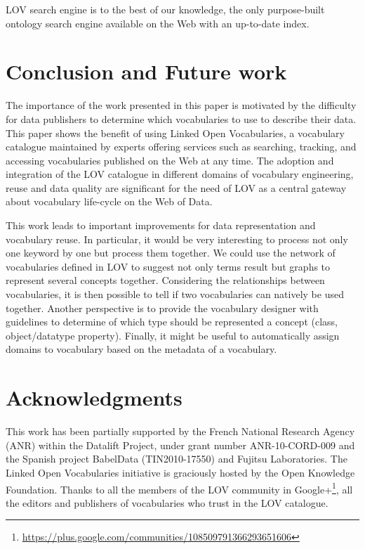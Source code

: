\documentclass{iosart2c}
\newcommand{\TODO}[1]{\textcolor{red}{\textbf{[TODO:#1]}}}
\begin{document}
LOV search engine is to the best of our knowledge, the only purpose-built ontology search engine available on the Web with an up-to-date index.

\section{Conclusion and Future work}
\label{sec:conclusion}
The importance of the work presented in this paper is motivated by the difficulty for data publishers to determine which vocabularies to use to describe their data. This paper shows the benefit of using Linked Open Vocabularies, a vocabulary catalogue maintained by experts offering services such as searching, tracking, and accessing vocabularies published on the Web at any time. The adoption and integration of the LOV catalogue in different domains of vocabulary engineering, reuse and data quality are significant for the need of LOV as a central gateway about vocabulary life-cycle on the Web of Data. 

This work leads to important improvements for data representation and vocabulary reuse. In particular, it would be very interesting to process not only one keyword by one but process them together. We could use the network of vocabularies defined in LOV to suggest not only terms result but graphs to represent several concepts together. Considering the relationships between vocabularies, it is then possible to tell if two vocabularies can natively be used together. Another perspective is to provide the vocabulary designer with guidelines to determine of which type should be represented a concept (class, object/datatype property). Finally, it might be useful to automatically assign domains to vocabulary based on the metadata of a vocabulary.

\section*{Acknowledgments}
This work has been partially supported by the French National Research Agency (ANR) within the Datalift Project, under grant number ANR-10-CORD-009 and the Spanish project BabelData (TIN2010-17550) and Fujitsu Laboratories. The Linked Open Vocabularies initiative is graciously hosted by the Open Knowledge Foundation. Thanks to all the members of the LOV community in Google+\footnote{\url{https://plus.google.com/communities/108509791366293651606}}, all the editors and publishers of vocabularies who trust in the LOV catalogue. 




\end{document}
